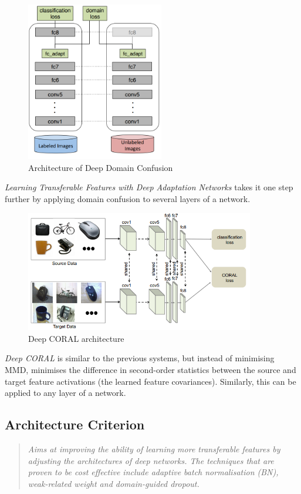 \documentclass{report}
\newcommand{\quoteit}[1]{\begin{quote}\textit{#1}\end{quote}}
\begin{document}
\begin{figure}[h]
	\centering
	\includegraphics[width=6cm]{imgs/domainconfusion2}
	\caption{Architecture of Deep Domain Confusion\parencite{deepdomainconfusion}}
	\label{fig:domainconfusion2}
\end{figure}
\textit{Learning Transferable Features with Deep Adaptation Networks}\parencite{learningtransferabledeepadaptation} takes it one step further by applying domain confusion to several layers of a network. \\

\begin{figure}[h]
	\centering
	\includegraphics[width=10cm]{imgs/deepcoral}
	\caption{Deep CORAL architecture\parencite{deepcoral}}
	\label{fig:deepcoral}
\end{figure}
\textit{Deep CORAL}\parencite{deepcoral} is similar to the previous systems, but instead of minimising MMD, minimises the difference in second-order statistics between the source and target
feature activations (the learned feature covariances). Similarly, this can be applied to any layer of a network.






\subsection{Architecture Criterion}
\quoteit{Aims at improving the ability of learning more transferable features by adjusting the architectures of deep networks. The techniques that are proven to be cost effective include adaptive batch normalisation (BN), weak-related weight and domain-guided dropout.}
\end{document}
